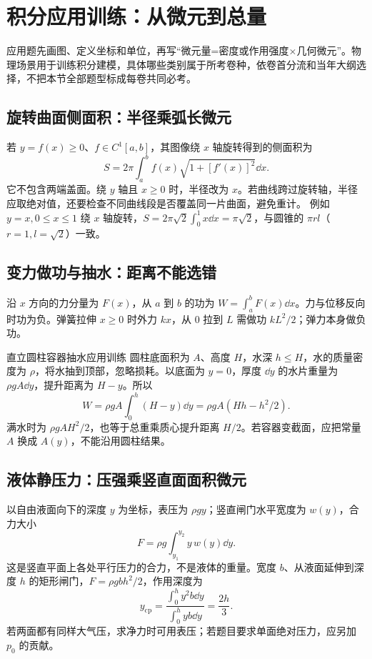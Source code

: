 \section{积分应用训练：从微元到总量}\label{r2:physics}
应用题先画图、定义坐标和单位，再写“微元量=密度或作用强度$\times$几何微元”。物理场景用于训练积分建模，具体哪些类别属于所考卷种，依卷首分流和当年大纲选择，不把本节全部题型标成每卷共同必考。

\subsection{旋转曲面侧面积：半径乘弧长微元}
若 $y=f(x)\ge0$、$f\in C^1[a,b]$，其图像绕 $x$ 轴旋转得到的侧面积为
\[
 S=2\pi\int_a^b f(x)\sqrt{1+[f'(x)]^2}\dd x.
\]
它不包含两端盖面。绕 $y$ 轴且 $x\ge0$ 时，半径改为 $x$。若曲线跨过旋转轴，半径应取绝对值，还要检查不同曲线段是否覆盖同一片曲面，避免重计。
例如 $y=x,0\le x\le1$ 绕 $x$ 轴旋转，$S=2\pi\sqrt2\int_0^1x\dd x=\pi\sqrt2$，与圆锥的 $\pi r l$（$r=1,l=\sqrt2$）一致。

\subsection{变力做功与抽水：距离不能选错}
沿 $x$ 方向的力分量为 $F(x)$，从 $a$ 到 $b$ 的功为 $W=\int_a^bF(x)\dd x$。力与位移反向时功为负。弹簧拉伸 $x\ge0$ 时外力 $kx$，从 $0$ 拉到 $L$ 需做功 $kL^2/2$；弹力本身做负功。

\begin{example}{直立圆柱容器抽水}{应用训练}
圆柱底面积为 $A$、高度 $H$，水深 $h\le H$，水的质量密度为 $\rho$，将水抽到顶部，忽略损耗。以底面为 $y=0$，厚度 $\dd y$ 的水片重量为 $\rho gA\dd y$，提升距离为 $H-y$。所以
\[
 W=\rho gA\int_0^h(H-y)\dd y
   =\rho gA(Hh-h^2/2).
\]
满水时为 $\rho gAH^2/2$，也等于总重乘质心提升距离 $H/2$。若容器变截面，应把常量 $A$ 换成 $A(y)$，不能沿用圆柱结果。
\end{example}

\subsection{液体静压力：压强乘竖直面面积微元}
以自由液面向下的深度 $y$ 为坐标，表压为 $\rho gy$；竖直闸门水平宽度为 $w(y)$，合力大小
\[
 F=\rho g\int_{y_1}^{y_2}y\,w(y)\dd y.
\]
这是竖直平面上各处平行压力的合力，不是液体的重量。宽度 $b$、从液面延伸到深度 $h$ 的矩形闸门，$F=\rho gbh^2/2$，作用深度为
\[
 y_{\mathrm{cp}}=\frac{\int_0^hy^2b\dd y}{\int_0^hyb\dd y}=\frac{2h}{3}.
\]
若两面都有同样大气压，求净力时可用表压；若题目要求单面绝对压力，应另加 $p_0$ 的贡献。

